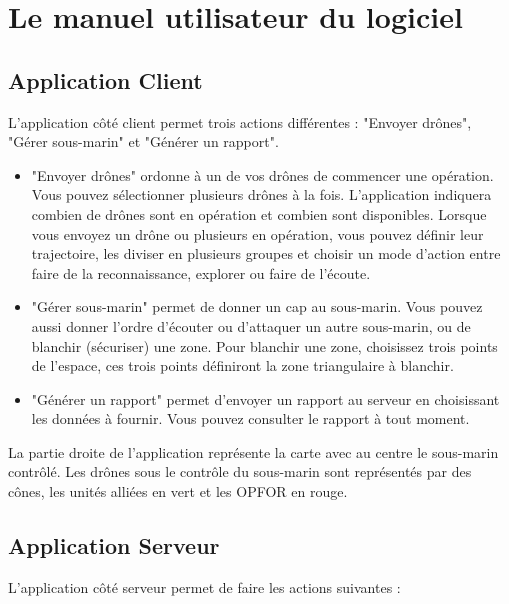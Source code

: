 \documentclass[12pt,a4paper]{scrartcl}
\theoremstyle{plain}
\theoremstyle{definition}
\theoremstyle{remark}
\begin{document}
	 \section{Le manuel utilisateur du logiciel}
	  \subsection{Application Client}
	 
	 L'application côté client permet trois actions différentes : "Envoyer drônes", "Gérer sous-marin" et "Générer un rapport".
	 
	 \begin{itemize}
	 	\item "Envoyer drônes" ordonne à un de vos drônes de commencer une opération. Vous pouvez sélectionner plusieurs drônes à la fois. L'application indiquera combien de drônes sont en opération et combien sont disponibles. Lorsque vous envoyez un drône ou plusieurs en opération, vous pouvez définir leur trajectoire, les diviser en plusieurs groupes et choisir un mode d'action entre faire de la reconnaissance, explorer ou faire de l'écoute.
	 	\item "Gérer sous-marin" permet de donner un cap au sous-marin. Vous pouvez aussi donner l'ordre d'écouter ou d'attaquer un autre sous-marin, ou de blanchir (sécuriser) une zone. Pour blanchir une zone, choisissez trois points de l'espace, ces trois points définiront la zone triangulaire à blanchir.
	 	\item "Générer un rapport" permet d'envoyer un rapport au serveur en choisissant les données à fournir. Vous pouvez consulter le rapport à tout moment.
	 \end{itemize}
	 
	 La partie droite de l'application représente la carte avec au centre le sous-marin contrôlé. Les drônes sous le contrôle du sous-marin sont représentés par des cônes, les unités alliées en vert et les OPFOR en rouge.
	 
	 \subsection{Application Serveur}
	 
	 L'application côté serveur permet de faire les actions suivantes :
	 
\end{document}
